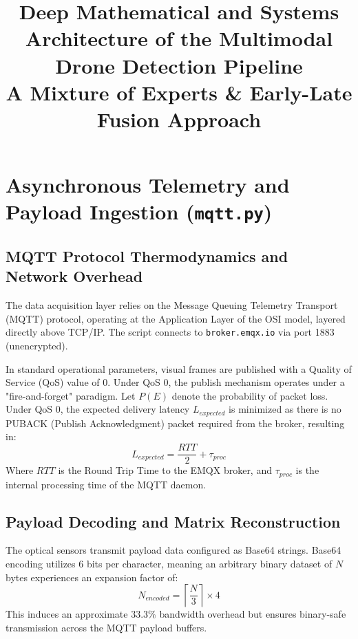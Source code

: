 \documentclass[11pt, letterpaper, oneside, openany]{book}
\title{
    \vspace{2cm}
    \Huge \textbf{Deep Mathematical and Systems Architecture of the Multimodal Drone Detection Pipeline} \\
    \Large \textbf{A Mixture of Experts \& Early-Late Fusion Approach} \\
    \vspace{1cm}
}
\author{}
\date{}
\begin{document}
\maketitle

\tableofcontents

\chapter{Asynchronous Telemetry and Payload Ingestion (\texttt{mqtt.py})}

\section{MQTT Protocol Thermodynamics and Network Overhead}
The data acquisition layer relies on the Message Queuing Telemetry Transport (MQTT) protocol, operating at the Application Layer of the OSI model, layered directly above TCP/IP. The script connects to \texttt{broker.emqx.io} via port 1883 (unencrypted).

In standard operational parameters, visual frames are published with a Quality of Service (QoS) value of $0$. Under QoS 0, the publish mechanism operates under a "fire-and-forget" paradigm. Let $P(E)$ denote the probability of packet loss. Under QoS 0, the expected delivery latency $L_{expected}$ is minimized as there is no PUBACK (Publish Acknowledgment) packet required from the broker, resulting in:
\begin{equation}
    L_{expected} = \frac{RTT}{2} + \tau_{proc}
\end{equation}
Where $RTT$ is the Round Trip Time to the EMQX broker, and $\tau_{proc}$ is the internal processing time of the MQTT daemon.

\section{Payload Decoding and Matrix Reconstruction}
The optical sensors transmit payload data configured as Base64 strings. Base64 encoding utilizes 6 bits per character, meaning an arbitrary binary dataset of $N$ bytes experiences an expansion factor of:
\begin{equation}
    N_{encoded} = \left\lceil \frac{N}{3} \right\rceil \times 4
\end{equation}
This induces an approximate $33.3\%$ bandwidth overhead but ensures binary-safe transmission across the MQTT payload buffers.
\end{document}
